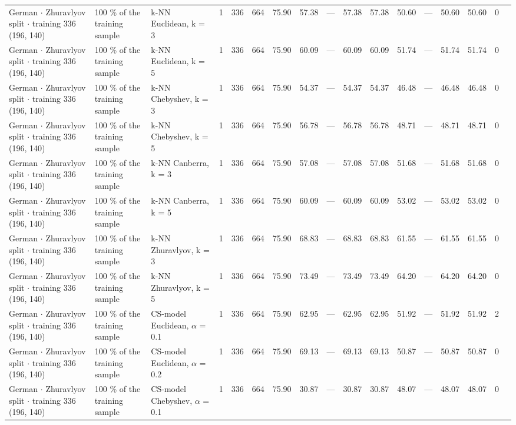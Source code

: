 \begin{longtable}{lllrrrrrrrrrrrrrl}
  German $\cdot$ Zhuravlyov split $\cdot$ training 336 (196, 140) & 100 \% of the training sample & k-NN Euclidean, k = 3 & 1 & 336 & 664 & 75.90 & 57.38 & --- & 57.38 & 57.38 & 50.60 & --- & 50.60 & 50.60 & 0 &  \\
  German $\cdot$ Zhuravlyov split $\cdot$ training 336 (196, 140) & 100 \% of the training sample & k-NN Euclidean, k = 5 & 1 & 336 & 664 & 75.90 & 60.09 & --- & 60.09 & 60.09 & 51.74 & --- & 51.74 & 51.74 & 0 &  \\
  German $\cdot$ Zhuravlyov split $\cdot$ training 336 (196, 140) & 100 \% of the training sample & k-NN Chebyshev, k = 3 & 1 & 336 & 664 & 75.90 & 54.37 & --- & 54.37 & 54.37 & 46.48 & --- & 46.48 & 46.48 & 0 &  \\
  German $\cdot$ Zhuravlyov split $\cdot$ training 336 (196, 140) & 100 \% of the training sample & k-NN Chebyshev, k = 5 & 1 & 336 & 664 & 75.90 & 56.78 & --- & 56.78 & 56.78 & 48.71 & --- & 48.71 & 48.71 & 0 &  \\
  German $\cdot$ Zhuravlyov split $\cdot$ training 336 (196, 140) & 100 \% of the training sample & k-NN Canberra, k = 3 & 1 & 336 & 664 & 75.90 & 57.08 & --- & 57.08 & 57.08 & 51.68 & --- & 51.68 & 51.68 & 0 &  \\
  German $\cdot$ Zhuravlyov split $\cdot$ training 336 (196, 140) & 100 \% of the training sample & k-NN Canberra, k = 5 & 1 & 336 & 664 & 75.90 & 60.09 & --- & 60.09 & 60.09 & 53.02 & --- & 53.02 & 53.02 & 0 &  \\
  German $\cdot$ Zhuravlyov split $\cdot$ training 336 (196, 140) & 100 \% of the training sample & k-NN Zhuravlyov, k = 3 & 1 & 336 & 664 & 75.90 & 68.83 & --- & 68.83 & 68.83 & 61.55 & --- & 61.55 & 61.55 & 0 &  \\
  German $\cdot$ Zhuravlyov split $\cdot$ training 336 (196, 140) & 100 \% of the training sample & k-NN Zhuravlyov, k = 5 & 1 & 336 & 664 & 75.90 & 73.49 & --- & 73.49 & 73.49 & 64.20 & --- & 64.20 & 64.20 & 0 &  \\
  German $\cdot$ Zhuravlyov split $\cdot$ training 336 (196, 140) & 100 \% of the training sample & CS-model Euclidean, $\alpha$ = 0.1 & 1 & 336 & 664 & 75.90 & 62.95 & --- & 62.95 & 62.95 & 51.92 & --- & 51.92 & 51.92 & 2 &  \\
  German $\cdot$ Zhuravlyov split $\cdot$ training 336 (196, 140) & 100 \% of the training sample & CS-model Euclidean, $\alpha$ = 0.2 & 1 & 336 & 664 & 75.90 & 69.13 & --- & 69.13 & 69.13 & 50.87 & --- & 50.87 & 50.87 & 0 &  \\
  German $\cdot$ Zhuravlyov split $\cdot$ training 336 (196, 140) & 100 \% of the training sample & CS-model Chebyshev, $\alpha$ = 0.1 & 1 & 336 & 664 & 75.90 & 30.87 & --- & 30.87 & 30.87 & 48.07 & --- & 48.07 & 48.07 & 0 &  \\

\end{longtable}
